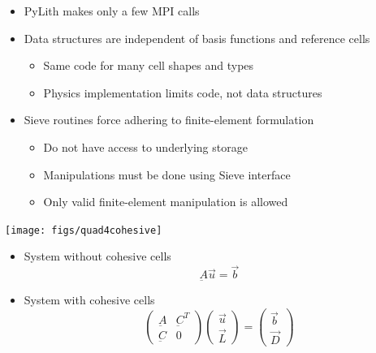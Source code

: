 \documentclass[pdftex,cig,slideColor]{pp4slides}
\begin{document}
 
 \begin{itemize}
 \item PyLith makes only a few MPI calls
 \item Data structures are independent of basis functions and
   reference cells
   \begin{itemize}
   \item Same code for many cell shapes and types
   \item Physics implementation limits code, not data structures
   \end{itemize}
 \item Sieve routines force adhering to finite-element formulation
   \begin{itemize}
   \item Do not have access to underlying storage
   \item Manipulations must be done using Sieve interface
   \item Only valid finite-element manipulation is allowed
   \end{itemize}
 \end{itemize}
  
 
  \vfill
  \begin{center}
    \texttt{[image: figs/quad4cohesive]}
  \end{center}


  \begin{itemize}
  \item System without cohesive cells
    \begin{equation}
      \underbar{A} \vec{u} = \vec{b} \nonumber
    \end{equation}
  \item System with cohesive cells
    \begin{equation}
      \left( \begin{array}{cc}
          \underbar{A} & \underbar{C}^T\\
          \underbar{C} & 0
        \end{array} \right)
      \left( \begin{array}{c}
          \vec{u}\\
          \vec{L}
        \end{array}\right)
      =
      \left( \begin{array}{c}
          \vec{b}\\
          \vec{D}
        \end{array} \right)
      \nonumber
    \end{equation}
  \end{itemize}
  
\end{document}
